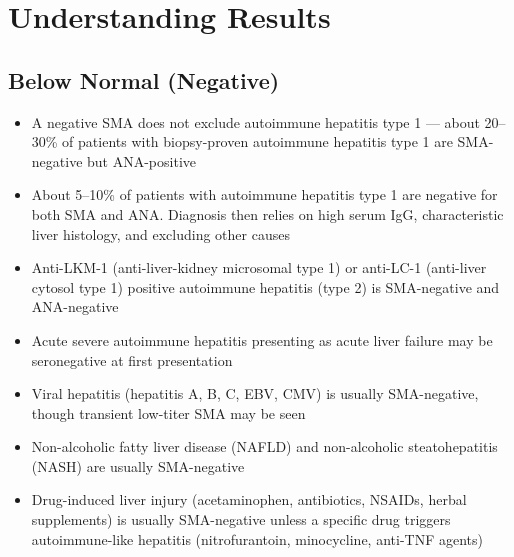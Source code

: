 \section*{Understanding Results}

\subsection*{Below Normal (Negative)}
\begin{itemize}
  \item A negative SMA does not exclude autoimmune hepatitis type 1 --- about 20--30\% of patients with biopsy-proven autoimmune hepatitis type 1 are SMA-negative but ANA-positive
  \item About 5--10\% of patients with autoimmune hepatitis type 1 are negative for both SMA and ANA. Diagnosis then relies on high serum IgG, characteristic liver histology, and excluding other causes
  \item Anti-LKM-1 (anti-liver-kidney microsomal type 1) or anti-LC-1 (anti-liver cytosol type 1) positive autoimmune hepatitis (type 2) is SMA-negative and ANA-negative
  \item Acute severe autoimmune hepatitis presenting as acute liver failure may be seronegative at first presentation
  \item Viral hepatitis (hepatitis A, B, C, EBV, CMV) is usually SMA-negative, though transient low-titer SMA may be seen
  \item Non-alcoholic fatty liver disease (NAFLD) and non-alcoholic steatohepatitis (NASH) are usually SMA-negative
  \item Drug-induced liver injury (acetaminophen, antibiotics, NSAIDs, herbal supplements) is usually SMA-negative unless a specific drug triggers autoimmune-like hepatitis (nitrofurantoin, minocycline, anti-TNF agents)
\end{itemize}

